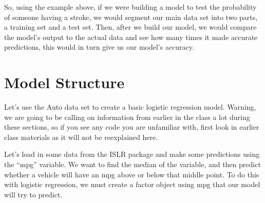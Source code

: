 \documentclass[
]{book}
\begin{document}
So, using the example above, if we were building a model to test the probability of someone having a stroke, we would segment our main data set into two parts, a training set and a test set. Then, after we build our model, we would compare the model's output to the actual data and see how many times it made accurate predictions, this would in turn give us our model's accuracy.

\hypertarget{model-structure-1}{%
\section{Model Structure}\label{model-structure-1}}

Let's use the Auto data set to create a basic logistic regression model. Warning, we are going to be calling on information from earlier in the class a lot during these sections, so if you see any code you are unfamiliar with, first look in earlier class materials as it will not be reexplained here.

Let's load in some data from the ISLR package and make some predictions using the ``mpg'' variable. We want to find the median of the variable, and then predict whether a vehicle will have an mpg above or below that middle point. To do this with logistic regression, we must create a factor object using mpg that our model will try to predict.
\end{document}
